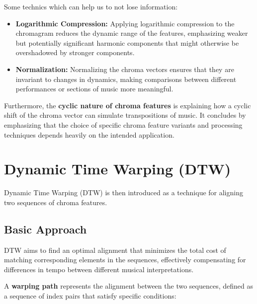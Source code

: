 \documentclass[a4paper, 9pt, twocolumn]{extarticle}
\begin{document}
Some technics which can help us to not lose information:

\begin{itemize}
  \item
        \textbf{Logarithmic Compression:} Applying logarithmic compression to
        the chromagram reduces the dynamic range of the features, emphasizing
        weaker but potentially significant harmonic components that might
        otherwise be overshadowed by stronger components.
  \item
        \textbf{Normalization:} Normalizing the chroma vectors ensures that
        they are invariant to changes in dynamics, making comparisons between
        different performances or sections of music more meaningful.
\end{itemize}

Furthermore, the \textbf{cyclic nature of chroma features} is explaining
how a cyclic shift of the chroma vector can simulate transpositions of
music. It concludes by emphasizing that the choice of specific chroma
feature variants and processing techniques depends heavily on the
intended application.

\section{Dynamic Time Warping (DTW)}
Dynamic Time Warping (DTW) is then introduced as a technique
for aligning two sequences of chroma features.

\subsection{ Basic Approach}
DTW aims to find an optimal alignment that minimizes the total cost of matching
corresponding elements in the sequences, effectively compensating for
differences in tempo between different musical interpretations.

A \textbf{warping path} represents the alignment between the two
sequences, defined as a sequence of index pairs that satisfy specific
conditions:
\end{document}
